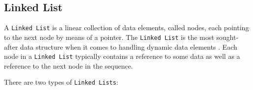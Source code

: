 
\subsection{Linked List}
A \lstinline{Linked List} is a linear collection of data elements, called nodes, each pointing to the next node by means of a pointer. The \lstinline{Linked List} is the most sought-after data structure when it comes to handling dynamic data elements \cite{ravikiran_2022}.
Each node in a \lstinline{Linked List} typically contains a reference to some data as well as a reference to the next node in the sequence.

There are two types of \lstinline{Linked Lists}:
